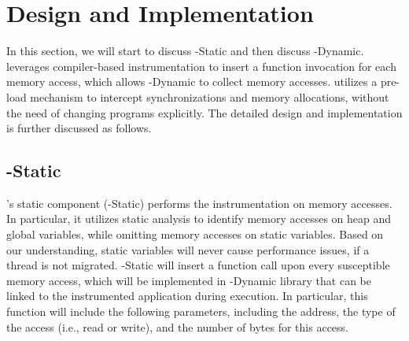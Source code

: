 \section{Design and Implementation}
\label{sec:implementation}

In this section, we will start to discuss \NP{}-Static and then discuss \NP{}-Dynamic. \NP{} leverages compiler-based instrumentation to insert a function invocation for each memory access, which allows \NP{}-Dynamic to collect memory accesses. \NP{} utilizes a pre-load mechanism to intercept synchronizations and memory allocations, without the need of changing programs explicitly. The detailed design and implementation is further discussed as follows. 

\begin{comment}
\NP{} leverages compiler-based instrumentation to insert a handle function for each memory access. This allows \NP{} to collect memory accesses.
how the memory is accessed in both page and cache level, and collect the sharing pattern when the memory object is freed by users.If they are never freed explicitly, \NP{} can do the collection in the end of the whole application. If too many remote memory access happened in a memory object, it needs an attention. Besides, \NP{} also collected thread based information like how many thread migration happened, how many different thread groups, and how many local and remote memory access incurred in each thread.Based on these thread based information, \NP{} could tell users what kinds of NUMA imbalance issues the application contained and how to fix it.

\end{comment}

\subsection{\NP{}-Static} 
\NP{}'s static component (\NP{}-Static) performs the instrumentation on memory accesses. In particular, it utilizes static analysis to identify memory accesses on heap and global variables, while omitting memory accesses on static variables. Based on our understanding, static variables will never cause performance issues, if a thread is not migrated. \NP{}-Static will insert a function call 
upon every susceptible memory access, which will be implemented in \NP{}-Dynamic library that can be linked to the instrumented application during execution. In particular, this function will include the following parameters, including the address, the type of the access (i.e., read or write), and the number of bytes for this access.  

